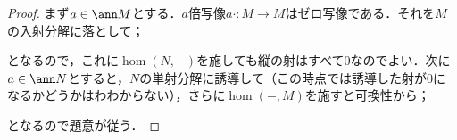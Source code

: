 \begin{proof}
	まず$a\in\ann M$とする．$a$倍写像$a\cdot:M\to M$はゼロ写像である．それを$M$の入射分解に落として；
	\begin{figure}[H]
		\centering
	\end{figure}
	となるので，これに$\hom(N,-)$を施しても縦の射はすべて$0$なのでよい．次に$a\in\ann N$とすると，$N$の単射分解に誘導して（この時点では誘導した射が$0$になるかどうかはわわからない），さらに$\hom(-,M)$を施すと可換性から；
	\begin{figure}[H]
		\centering
	\end{figure}
	となるので題意が従う．	
\end{proof}
%
